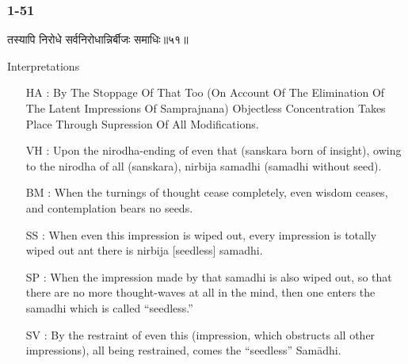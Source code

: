 \begin{frame}[fragile]\frametitle{1-51}
\begin{sanskrit}
तस्यापि निरोधे सर्वनिरोधान्निर्बीजः समाधिः॥५१॥
\end{sanskrit}

Interpretations
\begin{itemize}
\item [HA]: By The Stoppage Of That Too (On Account Of The Elimination Of The Latent Impressions Of Samprajnana) Objectless Concentration Takes Place Through Supression Of All Modifications.
\item [VH]: Upon the nirodha-ending of even that (sanskara born of insight), owing to the nirodha of all (sanskara), nirbija samadhi (samadhi without seed).
\item [BM]: When the turnings of thought cease completely, even wisdom ceases, and contemplation bears no seeds.
\item [SS]: When even this impression is wiped out, every impression is totally wiped out ant there is nirbija [seedless] samadhi.
\item [SP]: When the impression made by that samadhi is also wiped out, so that there are no more thought-waves at all in the mind, then one enters the samadhi which is called “seedless.”
\item [SV]: By the restraint of even this (impression, which obstructs all other impressions), all being restrained, comes the “seedless” Samādhi. 
\end{itemize}
	
\end{frame}
